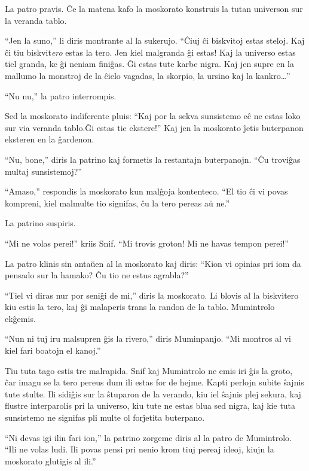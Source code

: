 La patro pravis. Ĉe la matena kafo la moskorato konstruis la tutan universon sur la veranda tablo.

``Jen la suno,'' li diris montrante al la sukerujo. ``Ĉiuj ĉi biskvitoj estas steloj. Kaj ĉi tiu biskvit\emph{ero} estas la tero. Jen kiel malgranda ĝi estas! Kaj la universo estas tiel granda, ke ĝi neniam finiĝas. Ĝi estas tute karbe nigra. Kaj jen supre en la mallumo la monstroj de la ĉielo vagadas, la skorpio, la ursino kaj la kankro{\ldots}''

``Nu nu,'' la patro interrompis.

Sed la moskorato indiferente pluis: ``Kaj por la sekva sunsistemo eĉ ne estas loko sur via veranda tablo.Ĝi estas tie ekstere!'' Kaj jen la moskorato ĵetis buterpanon eksteren en la ĝardenon.

``Nu, bone,'' diris la patrino kaj formetis la restantajn buterpanojn. ``Ĉu troviĝas multaj sunsistemoj?''

``Amaso,'' respondis la moskorato kun malĝoja kontenteco. ``El tio ĉi vi povas kompreni, kiel malmulte tio signifas, ĉu la tero pereas aŭ ne.''

La patrino suspiris.

``Mi ne volas perei!'' kriis Snif. ``Mi trovis groton! Mi ne havas tempon perei!''

La patro klinis sin antaŭen al la moskorato kaj diris: ``Kion vi opinias pri iom da pensado sur la hamako? Ĉu tio ne estus agrabla?''

``Tiel vi diras nur por seniĝi de mi,'' diris la moskorato. Li blovis al la biskvitero kiu estis la tero, kaj ĝi malaperis trans la randon de la tablo. Mumintrolo ekĝemis.

``Nun ni tuj iru malsupren ĝis la rivero,'' diris Muminpanjo. ``Mi montros al vi kiel fari boatojn el kanoj.''

\sectionbreak

Tiu tuta tago estis tre malrapida. Snif kaj Mumintrolo ne emis iri ĝis la groto, ĉar imagu se la tero pereus dum ili estas for de hejme. Kapti perlojn subite ŝajnis tute stulte. Ili sidiĝis sur la ŝtuparon de la verando, kiu iel ŝajnis plej sekura, kaj flustre interparolis pri la universo, kiu tute ne estas blua sed nigra, kaj kie tuta sunsistemo ne signifas pli multe ol forĵetita buterpano.

``Ni devas igi ilin fari ion,'' la patrino zorgeme diris al la patro de Mumintrolo. ``Ili ne volas ludi. Ili povas pensi pri nenio krom tiuj pereaj ideoj, kiujn la moskorato glutigis al ili.''

